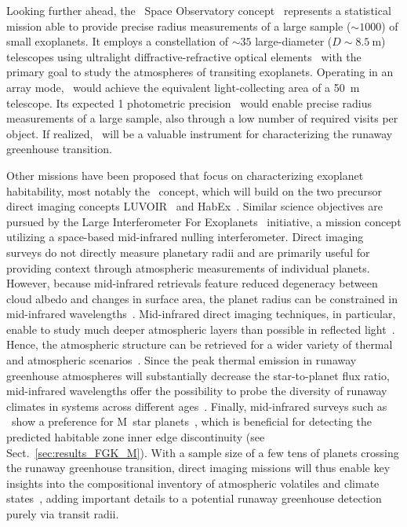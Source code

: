 \documentclass[twocolumn,twocolappendix]{aastex631}
\begin{document}
Looking further ahead, the \nautilus\ Space Observatory concept~\citep{Apai2019} represents a statistical mission able to provide precise radius measurements of a large sample ($\sim \num{1000}$) of small exoplanets.
It employs a constellation of $\sim \num{35}$ large-diameter ($D \sim \SI{8.5}{\meter}$) telescopes using ultralight diffractive-refractive optical elements~\citep{Milster2020} with the primary goal to study the atmospheres of transiting exoplanets.
Operating in an array mode, \nautilus\ would achieve the equivalent light-collecting area of a \SI{50}{\meter} telescope.
Its expected \SI{1}{\ppm} photometric precision~\citep{Apai2022} would enable precise radius measurements of a large sample, also through a low number of required visits per object.
If realized, \nautilus\ will be a valuable instrument for characterizing the runaway greenhouse transition.

Other missions have been proposed that focus on characterizing exoplanet habitability, most notably the \hwo\ concept, which will build on the two precursor direct imaging concepts LUVOIR~\citep{LUVOIR2019} and HabEx~\citep{Gaudi2020c}.
Similar science objectives are pursued by the Large Interferometer For Exoplanets~\citep[\life,][]{Quanz2022} initiative, a mission concept utilizing a space-based mid-infrared nulling interferometer.
Direct imaging surveys do not directly measure planetary radii and are primarily useful for providing context through atmospheric measurements of individual planets.
However, because mid-infrared retrievals feature reduced degeneracy between cloud albedo and changes in surface area, the planet radius can be constrained in mid-infrared wavelengths~\citep{2018ExA....46..543D,2021ExA...tmp..118Q}.
Mid-infrared direct imaging techniques, in particular, enable to study much deeper atmospheric layers than possible in reflected light~\citep{Wordsworth2022}.
Hence, the atmospheric structure can be retrieved for a wider variety of thermal and atmospheric scenarios~\citep{Alei2022,Konrad2022}.
Since the peak thermal emission in runaway greenhouse atmospheres will substantially decrease the star-to-planet flux ratio, mid-infrared wavelengths offer the possibility to probe the diversity of runaway climates in systems across different ages~\citep{2014ApJ...784...27L,2019A&A...621A.125B}.
Finally, mid-infrared surveys such as \life\ show a preference for M~star planets~\citep{Quanz2022}, which is beneficial for detecting the predicted habitable zone inner edge discontinuity (see Sect.~\ref{sec:results_FGK_M}).
With a sample size of a few tens of planets crossing the runaway greenhouse transition, direct imaging missions will thus enable key insights into the compositional inventory of atmospheric volatiles and climate states~\citep{2021exbi.book....5H,2022arXiv220505696C}, adding important details to a potential runaway greenhouse detection purely via transit radii.
\end{document}
